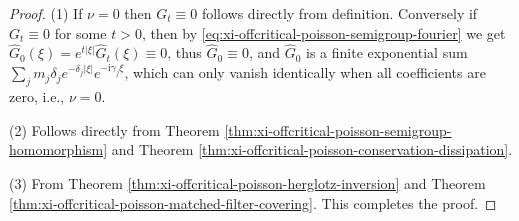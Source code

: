 \begin{proof}
(1) If \(\nu=0\) then \(G_t\equiv 0\) follows directly from definition. Conversely if \(G_t\equiv 0\) for some \(t>0\), then by \eqref{eq:xi-offcritical-poisson-semigroup-fourier} we get \(\widehat G_0(\xi)=e^{t|\xi|}\widehat G_t(\xi)\equiv 0\), thus \(\widehat G_0\equiv 0\), and \(\widehat G_0\) is a finite exponential sum \(\sum_j m_j\delta_j e^{-\delta_j|\xi|}e^{-\mathrm{i}\gamma_j\xi}\), which can only vanish identically when all coefficients are zero, i.e., \(\nu=0\).
\par
(2) Follows directly from Theorem \ref{thm:xi-offcritical-poisson-semigroup-homomorphism} and Theorem \ref{thm:xi-offcritical-poisson-conservation-dissipation}.
\par
(3) From Theorem \ref{thm:xi-offcritical-poisson-herglotz-inversion} and Theorem \ref{thm:xi-offcritical-poisson-matched-filter-covering}. This completes the proof.
\end{proof}

\endinput


















